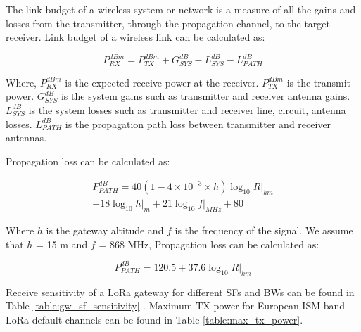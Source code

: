 \documentclass[conference]{IEEEtran}
\begin{document}
The link budget of a wireless system or network is a measure of all the gains and losses from the transmitter, through the propagation channel, to the target receiver. Link budget of a wireless link can be calculated as:

\begin{equation} \label{eq:expected_rx_power}
P^{dBm}_{RX} = P^{dBm}_{TX} + G^{dB}_{SYS} - L^{dB}_{SYS} - L^{dB}_{PATH}
\end{equation}

\par Where, $P^{dBm}_{RX}$ is the expected receive power at the receiver. $P^{dBm}_{TX}$ is the transmit power. $G^{dB}_{SYS}$ is the system gains such as transmitter and receiver antenna gains. $L^{dB}_{SYS}$ is the system losses such as transmitter and receiver line, circuit, antenna losses. $L^{dB}_{PATH}$ is the propagation path loss between transmitter and receiver antennas.

\par Propagation loss can be calculated as:

\begin{equation} \label{eq:propagation_loss}
\begin{split}
P^{dB}_{PATH} = 40(1 - 4 \times 10^{-3} \times h){\log_{10} R|_{km}} \\
- 18 {\log_{10} h|_{m}} + 21 {\log_{10} f|_{MHz}} + 80
\end{split}
\end{equation}

\par Where $h$ is the gateway altitude and $f$ is the frequency of the signal. We assume that $h$ = 15 m and $f$ = 868 MHz, Propagation loss can be calculated as:

\begin{equation} \label{eq:propagation_loss_simplified}
P^{dB}_{PATH} = 120.5 + 37.6 {\log_{10} R|_{km}}
\end{equation}

\par Receive sensitivity of a LoRa gateway for different SFs and BWs can be found in Table \ref{table:gw_sf_sensitivity} \cite{SX1276}. Maximum TX power for European ISM band LoRa default channels can be found in Table \ref{table:max_tx_power}.
\end{document}

